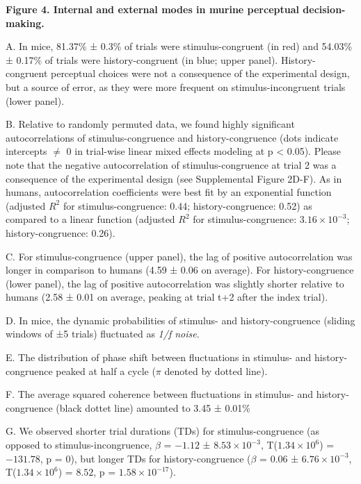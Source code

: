 \documentclass[
]{article}
\begin{document}
\textbf{Figure 4. Internal and external modes in murine perceptual
decision-making.}

A. In mice, 81.37\% ± 0.3\% of trials were stimulus-congruent (in red)
and 54.03\% ± 0.17\% of trials were history-congruent (in blue; upper
panel). History-congruent perceptual choices were not a consequence of
the experimental design, but a source of error, as they were more
frequent on stimulus-incongruent trials (lower panel).

B. Relative to randomly permuted data, we found highly significant
autocorrelations of stimulus-congruence and history-congruence (dots
indicate intercepts \(\neq\) 0 in trial-wise linear mixed effects
modeling at p \textless{} 0.05). Please note that the negative
autocorrelation of stimulus-congruence at trial 2 was a consequence of
the experimental design (see Supplemental Figure 2D-F). As in humans,
autocorrelation coefficients were best fit by an exponential function
(adjusted \(R^2\) for stimulus-congruence: 0.44; history-congruence:
0.52) as compared to a linear function (adjusted \(R^2\) for
stimulus-congruence: \ensuremath{3.16\times 10^{-3}};
history-congruence: 0.26).

C. For stimulus-congruence (upper panel), the lag of positive
autocorrelation was longer in comparison to humans (4.59 ± 0.06 on
average). For history-congruence (lower panel), the lag of positive
autocorrelation was slightly shorter relative to humans (2.58 ± 0.01 on
average, peaking at trial t+2 after the index trial).

D. In mice, the dynamic probabilities of stimulus- and
history-congruence (sliding windows of ±5 trials) fluctuated as
\emph{1/f noise}.

E. The distribution of phase shift between fluctuations in stimulus- and
history-congruence peaked at half a cycle (\(\pi\) denoted by dotted
line).

F. The average squared coherence between fluctuations in stimulus- and
history-congruence (black dottet line) amounted to 3.45 ± 0.01\%

G. We observed shorter trial durations (TDs) for stimulus-congruence (as
opposed to stimulus-incongruence, \(\beta\) = \(-1.12\) ±
\(\ensuremath{8.53\times 10^{-3}}\),
T(\(\ensuremath{1.34\times 10^{6}}\)) = \(-131.78\), p = \(0\)), but
longer TDs for history-congruence (\(\beta\) = \(0.06\) ±
\(\ensuremath{6.76\times 10^{-3}}\),
T(\(\ensuremath{1.34\times 10^{6}}\)) = \(8.52\), p =
\(\ensuremath{1.58\times 10^{-17}}\)).
\end{document}

